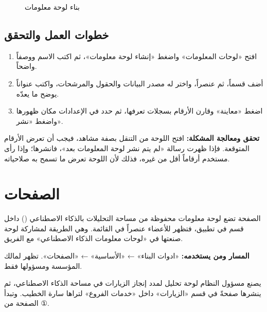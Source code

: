 \begin{figure}[H]
\centering
{}
\rclegend
\caption{بناء لوحة معلومات}
\label{fig:builder-dashboards-flow}
\end{figure}

\subsection{خطوات العمل والتحقق}
\begin{enumerate}
\item افتح «لوحات المعلومات» واضغط «إنشاء لوحة معلومات»، ثم اكتب الاسم ووصفاً واضحاً.
\item أضف قسماً، ثم عنصراً، واختر له مصدر البيانات والحقول والمرشحات، واكتب عنواناً يوضح ما يعدّه.
\item اضغط «معاينة» وقارن الأرقام بسجلات تعرفها، ثم حدد في الإعدادات مكان ظهورها واضغط «نشر».
\end{enumerate}

\textbf{تحقق ومعالجة المشكلة:} افتح اللوحة من التنقل بصفة مشاهد، فيجب أن تعرض الأرقام المتوقعة. فإذا ظهرت رسالة «لم يتم نشر لوحة المعلومات بعد»، فانشرها؛ وإذا رأى مستخدم أرقاماً أقل من غيره، فذلك لأن اللوحة تعرض ما تسمح به صلاحياته.

\clearpage
\section{الصفحات}
\label{sec:builder-feature-pages}

الصفحة تضع لوحة معلومات محفوظة من مساحة التحليلات بالذكاء الاصطناعي () داخل قسم في تطبيق، فتظهر للأعضاء عنصراً في القائمة. وهي الطريقة لمشاركة لوحة صنعتها في «لوحات معلومات الذكاء الاصطناعي» مع الفريق.

\textbf{المسار ومن يستخدمه:} «ادوات البناء» ← «الأساسية» ← «الصفحات». تظهر لمالك المؤسسة ومسؤولها فقط.

\begin{rcnote}
يصنع مسؤول النظام لوحة تحليل لمدد إنجاز الزيارات في مساحة الذكاء الاصطناعي، ثم ينشرها صفحةً في قسم «الزيارات» داخل «خدمات الفروع» لتراها سارة الخطيب. وتبدأ الصفحة من ①.
\end{rcnote}

